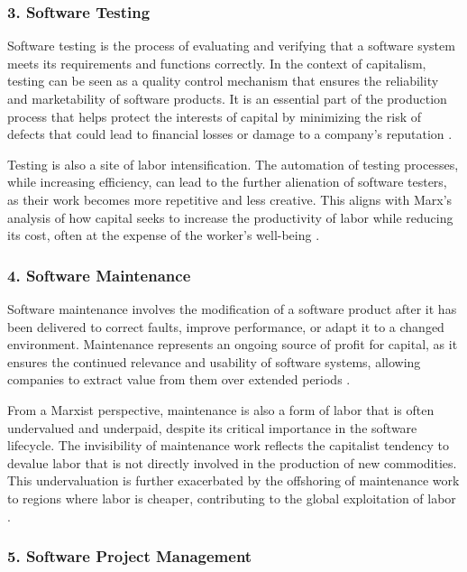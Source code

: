 \begin{refsection}
\begin{multicols}{2}
{\subsubsection*{3. Software Testing}

Software testing is the process of evaluating and verifying that a software system meets its requirements and functions correctly. In the context of capitalism, testing can be seen as a quality control mechanism that ensures the reliability and marketability of software products. It is an essential part of the production process that helps protect the interests of capital by minimizing the risk of defects that could lead to financial losses or damage to a company’s reputation \cite{schiller1999digital}.

Testing is also a site of labor intensification. The automation of testing processes, while increasing efficiency, can lead to the further alienation of software testers, as their work becomes more repetitive and less creative. This aligns with Marx’s analysis of how capital seeks to increase the productivity of labor while reducing its cost, often at the expense of the worker’s well-being \cite{marx1867capital}.

\subsubsection*{4. Software Maintenance}

Software maintenance involves the modification of a software product after it has been delivered to correct faults, improve performance, or adapt it to a changed environment. Maintenance represents an ongoing source of profit for capital, as it ensures the continued relevance and usability of software systems, allowing companies to extract value from them over extended periods \cite{fuchs2015digital}.

From a Marxist perspective, maintenance is also a form of labor that is often undervalued and underpaid, despite its critical importance in the software lifecycle. The invisibility of maintenance work reflects the capitalist tendency to devalue labor that is not directly involved in the production of new commodities. This undervaluation is further exacerbated by the offshoring of maintenance work to regions where labor is cheaper, contributing to the global exploitation of labor \cite{scholz2016platform}.

\subsubsection*{5. Software Project Management}

}
\end{multicols}
\end{refsection}
